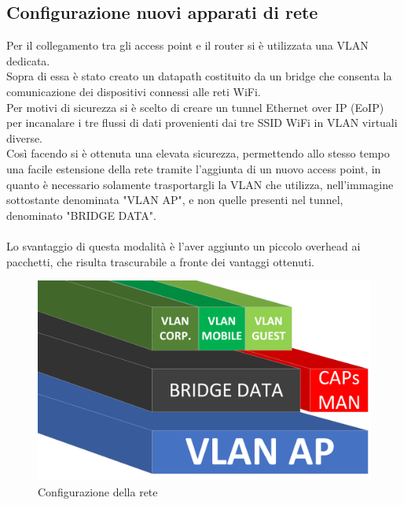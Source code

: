 \documentclass[Realizzazione.tex]{subfiles}
\begin{document}
\newpage
\subsection{Configurazione nuovi apparati di rete}
Per il collegamento tra gli access point e il router si è utilizzata una VLAN dedicata. \\
Sopra di essa è stato creato un datapath costituito da un bridge che consenta la comunicazione dei dispositivi connessi alle reti WiFi. \\
Per motivi di sicurezza si è scelto di creare un tunnel Ethernet over IP (EoIP) per incanalare i tre flussi di dati provenienti dai tre SSID WiFi in VLAN virtuali diverse. \\
Così facendo si è ottenuta una elevata sicurezza, permettendo allo stesso tempo una facile estensione della rete tramite l'aggiunta di un nuovo access point, in quanto è necessario solamente trasportargli la VLAN che utilizza, nell'immagine sottostante denominata "VLAN AP", e non quelle presenti nel tunnel, denominato "BRIDGE DATA". \\\\
Lo svantaggio di questa modalità è l'aver aggiunto un piccolo overhead ai pacchetti, che risulta trascurabile a fronte dei vantaggi ottenuti.

\begin{figure}[H]
	\centering
	\includegraphics[width=0.6\linewidth]{"images/VLAN"}
	\caption{Configurazione della rete}
	\label{fig:Configurazione della rete}
\end{figure}
\end{document}
